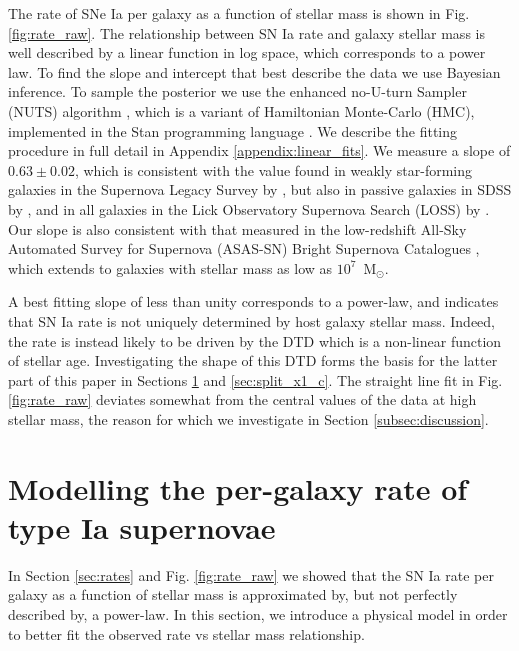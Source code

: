 \documentclass[fleqn,usenatbib]{mnras}
\begin{document}
The rate of SNe Ia per galaxy as a function of stellar mass is shown in Fig. \ref{fig:rate_raw}. The relationship between SN Ia rate and galaxy stellar mass is well described by a linear function in log space, which corresponds to a power law. To find the slope and intercept that best describe the data we use Bayesian inference. To sample the posterior we use the enhanced no-U-turn Sampler (NUTS) algorithm \citep{Betancourt2017}, which is a variant of Hamiltonian Monte-Carlo (HMC), implemented in the Stan programming language \citep{Carpenter2017}. We describe the fitting procedure in full detail in Appendix \ref{appendix:linear_fits}. We measure a slope of $0.63\pm0.02$, which is consistent with the value found in weakly star-forming galaxies in the Supernova Legacy Survey by \citet{Sullivan2006}, but also in passive galaxies in SDSS by \citet{Smith2012}, and in all galaxies in the Lick Observatory Supernova Search (LOSS) by \citet{Li2011a}. Our slope is also consistent with that measured in the low-redshift All-Sky Automated Survey for Supernova (ASAS-SN) Bright Supernova Catalogues \citep{Brown2019}, which extends to galaxies with stellar mass as low as $10^7$~M$_{\odot}$.

A best fitting slope of less than unity corresponds to a power-law, and indicates that SN Ia rate is not uniquely determined by host galaxy stellar mass. Indeed, the rate is instead likely to be driven by the DTD which is a non-linear function of stellar age. Investigating the shape of this DTD forms the basis for the latter part of this paper in Sections \ref{sec:model} and \ref{sec:split_x1_c}. The straight line fit in Fig. \ref{fig:rate_raw} deviates somewhat from the central values of the data at high stellar mass, the reason for which we investigate in Section \ref{subsec:discussion}.

\section{Modelling the per-galaxy rate of type Ia supernovae}
 \label{sec:model}
 
In Section \ref{sec:rates} and Fig. \ref{fig:rate_raw} we showed that the SN Ia rate per galaxy as a function of stellar mass is approximated by, but not perfectly described by, a power-law. In this section, we introduce a physical model in order to better fit the observed rate vs stellar mass relationship. 
\end{document}
